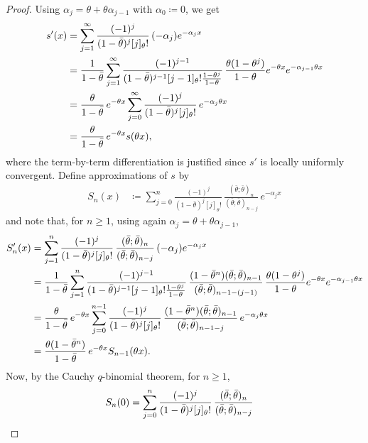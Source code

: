 \documentclass[12pt]{article}
\newcommand{\1}{\mathds{1}}
\theoremstyle{definition}
\theoremstyle{plain}
\theoremstyle{remark}
\begin{document}
\begin{proof}
Using $\alpha_j = \theta + \theta \alpha_{j-1}$ with $\alpha_0\coloneqq 0$, we get
\begin{align}\label{eqn:dgl}
s'(x)
 & = \sum_{j=1}^\infty \frac{(-1)^j}{ (1-\bar \theta)^j [j]_\theta!}\, (-\alpha_j) e^{-\alpha_j x}\notag
\\
 & = \frac{1}{1-\bar \theta}\sum_{j=1}^\infty \frac{(-1)^{j-1}}{ (1-\bar \theta)^{j-1} [j-1]_\theta! \frac{1-\theta^j}{1-\theta}}\, \frac{\theta (1-\theta^j)}{1-\theta} e^{-\theta x} e^{-\alpha_{j-1} \theta x}\notag
\\
 & = \frac{\theta}{1-\bar \theta}\,e^{-\theta x}\sum_{j=0}^{\infty} \frac{(-1)^{j}}{ (1-\bar \theta)^{j} [j]_\theta! }\,  e^{-\alpha_{j} \theta x}\notag
\\
&= \frac{\theta}{1-\bar \theta}\,e^{-\theta x} s(\theta x),
\end{align}
where the term-by-term differentiation is justified since $s'$ is locally uniformly convergent. Define approximations of $s$ by
\begin{align*}
S_n(x) & \coloneqq  \sum_{j=0}^n \frac{(-1)^j}{ (1-\bar \theta)^j [j]_\theta!}\,\frac{(\bar\theta;\bar\theta)_n}{(\bar\theta;\bar\theta)_{n-j}}\, e^{-\alpha_j x}
\end{align*}
and note that, for $n\ge 1$, using again $\alpha_j = \theta + \theta \alpha_{j-1}$,
\begin{align}
S_n'(x)
 & = \sum_{j=1}^n \frac{(-1)^j}{ (1-\bar \theta)^j [j]_\theta!}\, \frac{(\bar\theta;\bar\theta)_n}{(\bar\theta;\bar\theta)_{n-j}}\,(-\alpha_j) e^{-\alpha_j x} \notag
\\
 & = \frac{1}{1-\bar \theta}\sum_{j=1}^n \frac{(-1)^{j-1}}{ (1-\bar \theta)^{j-1} [j-1]_\theta! \frac{1-\theta^j}{1-\theta}}\, \frac{(1-\bar\theta^n)(\bar\theta;\bar\theta)_{n-1}}{(\bar\theta;\bar\theta)_{n-1-(j-1)}}\,\frac{\theta (1-\theta^j)}{1-\theta} e^{-\theta x} e^{-\alpha_{j-1} \theta x} \notag
\\
 & = \frac{\theta}{1-\bar \theta}\,e^{-\theta x}\sum_{j=0}^{n-1} \frac{(-1)^{j}}{ (1-\bar \theta)^{j} [j]_\theta! }\,  \frac{(1-\bar\theta^{n})(\bar\theta;\bar\theta)_{n-1}}{(\bar\theta;\bar\theta)_{n-1-j}}\, e^{-\alpha_{j} \theta x} \notag
\\
&= \frac{\theta(1-\bar\theta^{n})}{1-\bar \theta}\,e^{-\theta x} S_{n-1}(\theta x). \label{eqn:recursiondgl}
\end{align}
Now, by the Cauchy $q$-binomial theorem, for $n\ge 1$,
\begin{align}
S_n(0) & = \sum_{j=0}^n \frac{(-1)^j}{ (1-\bar \theta)^j [j]_\theta!}\,\frac{(\bar\theta;\bar\theta)_n}{(\bar\theta;\bar\theta)_{n-j}} \notag

\end{align}
\end{proof}
\end{document}
